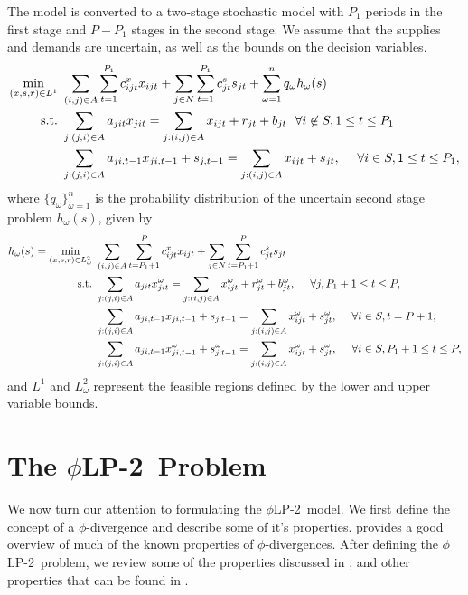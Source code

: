\documentclass[opre,nonblindrev]{informs3} %
\newcommand{\st}{\mbox{s.t.}}
\newcommand{\plp}{$\phi$LP-2}
\begin{document}
The model is converted to a two-stage stochastic model with $P_1$ periods in the first stage and $P-P_1$ stages in the second stage.
We assume that the supplies and demands are uncertain, as well as the bounds on the decision variables.
\begin{align}
	\min_{(x,s,r) \in L^1} \ & \sum_{(i,j) \in A} \sum_{t=1}^{P_1} c_{ijt}^x x_{ijt} + \sum_{j \in N} \sum_{t=1}^{P_1} c_{jt}^s s_{jt} + \sum_{\omega=1}^n q_\omega h_\omega(s) \label{eq:gen_network_two_stage} \\
	\st \ & \sum_{j : (j,i) \in A} a_{jit} x_{jit} = \sum_{j : (i,j) \in A} x_{ijt} + r_{jt} + b_{jt} \ \ \forall i \not\in S, 1 \leq t \leq P_1 \notag \\
	& \sum_{j : (j,i) \in A} a_{ji,t-1} x_{ji,t-1} + s_{j,t-1} = \sum_{j : (i,j) \in A} x_{ijt} + s_{jt},\ \ \ \ \forall i \in S, 1 \leq t \leq P_1, \notag
\end{align}
where $\{q_\omega\}_{\omega = 1}^n$ is the probability distribution of the uncertain second stage problem $h_\omega(s)$, given by
\begin{align}
	h_\omega(s) = \min_{(x,s,r) \in L^2_\omega} \ & \sum_{(i,j) \in A} \sum_{t=P_1+1}^{P} c_{ijt}^x x_{ijt} + \sum_{j \in N} \sum_{t=P_1+1}^{P} c_{jt}^s s_{jt} \label{eq:gen_network_second_stage} \\
	\st \ & \sum_{j : (j,i) \in A} a_{jit} x_{jit}^\omega = \sum_{j : (i,j) \in A} x_{ijt}^\omega + r_{jt}^\omega + b_{jt}^\omega, \ \ \ \ \forall j, P_1+1 \leq t \leq P, \notag \\
	& \sum_{j : (j,i) \in A} a_{ji,t-1} x_{ji,t-1} + s_{j,t-1} = \sum_{j : (i,j) \in A} x_{ijt}^\omega + s_{jt}^\omega,\ \ \ \ \forall i \in S, t = P+1, \notag \\
	& \sum_{j : (j,i) \in A} a_{ji,t-1} x_{ji,t-1}^\omega + s_{j,t-1}^\omega = \sum_{j : (i,j) \in A} x_{ijt}^\omega + s_{jt}^\omega,\ \ \ \ \forall i \in S, P_1+1 \leq t \leq P, \notag
\end{align}
and $L^1$ and $L^2_\omega$ represent the feasible regions defined by the lower and upper variable bounds.



\section{The \plp\ Problem}
\label{sec:phi_divergences}

We now turn our attention to formulating the \plp\ model.
We first define the concept of a $\phi$-divergence and describe some of it's properties.
\cite{pardo2005statistical} provides a good overview of much of the known properties of $\phi$-divergences.
After defining the \plp\ problem, we review some of the properties discussed in \cite{love2013phi}, and other properties that can be found in \cite{bental2011robust}.
\end{document}
